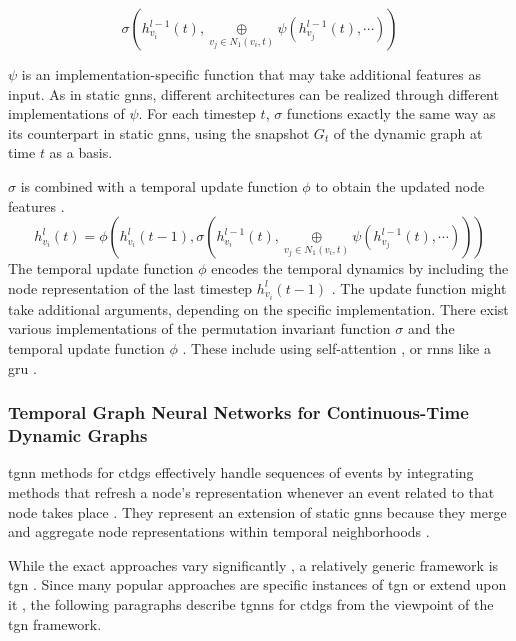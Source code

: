 \begin{equation}
    \sigma(h_{v_i}^{l-1}(t), \underset{v_j \in N_1(v_i, t)}{\oplus} \psi(h_{v_j}^{l-1}(t), \cdots))
\end{equation}

$\psi$ is an implementation-specific function that may take additional features as input. As in static \glspl{gnn}, different architectures can be realized through different implementations of $\psi$. For each timestep $t$, $\sigma$ functions exactly the same way as its counterpart in static \glspl{gnn}, using the snapshot $G_t$ of the dynamic graph at time $t$ as a basis.

$\sigma$ is combined with a temporal update function $\phi$ to obtain the updated node features \cite{you_roland_2022}.
\begin{equation}
    h_{v_i}^l(t) = \phi(h_{v_i}^{l}(t-1), \sigma(h_{v_i}^{l-1}(t), \underset{v_j \in N_1(v_i, t)}{\oplus} \psi(h_{v_j}^{l-1}(t), \cdots)))
\end{equation}
The temporal update function $\phi$ encodes the temporal dynamics by including the node representation of the last timestep $h_{v_i}^{l}(t-1)$ \cite{longa_graph_2023}. The update function might take additional arguments, depending on the specific implementation. There exist various implementations of the permutation invariant function $\sigma$ and the temporal update function $\phi$ \cite{longa_graph_2023}. These include using self-attention \cite{sankar_dysat_2020}, or \glspl{rnn} like a \gls{gru} \cite{you_roland_2022}.

\newpage

\subsubsection{Temporal Graph Neural Networks for Continuous-Time Dynamic Graphs}
\label{s_tgnns_for_ctdgs}
\gls{tgnn} methods for \glspl{ctdg} effectively handle sequences of events by integrating methods that refresh a node's representation whenever an event related to that node takes place \cite{longa_graph_2023}. They represent an extension of static \glspl{gnn} because they merge and aggregate node representations within temporal neighborhoods \cite{longa_graph_2023}.

While the exact approaches vary significantly \cite{longa_graph_2023}, a relatively generic framework is \gls{tgn} \cite{rossi_temporal_2020}. Since many popular approaches are specific instances of \gls{tgn} \cite{trivedi_dyrep_2019, rossi_temporal_2020} or extend upon it \cite{souza_provably_2022}, the following paragraphs describe \glspl{tgnn} for \glspl{ctdg} from the viewpoint of the \gls{tgn} framework.

